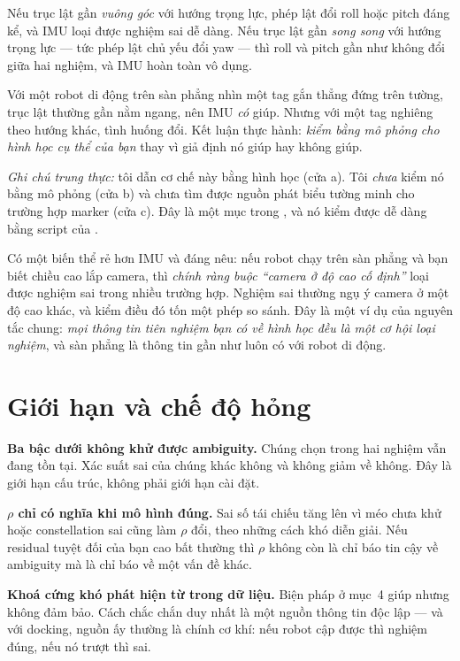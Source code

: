 \documentclass[../../marker.tex]{subfiles}
\begin{document}
Nếu trục lật gần \emph{vuông góc} với hướng trọng lực, phép lật đổi roll hoặc pitch đáng kể, và IMU loại được nghiệm sai dễ dàng. Nếu trục lật gần \emph{song song} với hướng trọng lực --- tức phép lật chủ yếu đổi yaw --- thì roll và pitch gần như không đổi giữa hai nghiệm, và IMU hoàn toàn vô dụng.

Với một robot di động trên sàn phẳng nhìn một tag gắn thẳng đứng trên tường, trục lật thường gần nằm ngang, nên IMU \emph{có} giúp. Nhưng với một tag nghiêng theo hướng khác, tình huống đổi. Kết luận thực hành: \emph{kiểm bằng mô phỏng cho hình học cụ thể của bạn} thay vì giả định nó giúp hay không giúp.

\emph{Ghi chú trung thực:} tôi dẫn cơ chế này bằng hình học (cửa a). Tôi \emph{chưa} kiểm nó bằng mô phỏng (cửa b) và chưa tìm được nguồn phát biểu tường minh cho trường hợp marker (cửa c). Đây là một mục trong , và nó kiểm được dễ dàng bằng script của .

Có một biến thể rẻ hơn IMU và đáng nêu: nếu robot chạy trên sàn phẳng và bạn biết chiều cao lắp camera, thì \emph{chính ràng buộc ``camera ở độ cao cố định''} loại được nghiệm sai trong nhiều trường hợp. Nghiệm sai thường ngụ ý camera ở một độ cao khác, và kiểm điều đó tốn một phép so sánh. Đây là một ví dụ của nguyên tắc chung: \emph{mọi thông tin tiên nghiệm bạn có về hình học đều là một cơ hội loại nghiệm}, và sàn phẳng là thông tin gần như luôn có với robot di động.

\section{Giới hạn và chế độ hỏng}

\textbf{Ba bậc dưới không khử được ambiguity.} Chúng chọn trong hai nghiệm vẫn đang tồn tại. Xác suất sai của chúng khác không và không giảm về không. Đây là giới hạn cấu trúc, không phải giới hạn cài đặt.

\textbf{\(\rho\) chỉ có nghĩa khi mô hình đúng.} Sai số tái chiếu tăng lên vì méo chưa khử hoặc constellation sai cũng làm \(\rho\) đổi, theo những cách khó diễn giải. Nếu residual tuyệt đối của bạn cao bất thường thì \(\rho\) không còn là chỉ báo tin cậy về ambiguity mà là chỉ báo về một vấn đề khác.

\textbf{Khoá cứng khó phát hiện từ trong dữ liệu.} Biện pháp ở mục~4 giúp nhưng không đảm bảo. Cách chắc chắn duy nhất là một nguồn thông tin độc lập --- và với docking, nguồn ấy thường là chính cơ khí: nếu robot cập được thì nghiệm đúng, nếu nó trượt thì sai.
\end{document}
